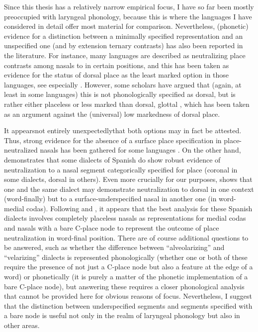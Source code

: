 Since this thesis has a relatively narrow empirical focus, I have so far been mostly preoccupied with laryngeal phonology, because this is where the languages I have considered in detail offer most material for comparison. Nevertheless, (phonetic) evidence for a distinction between a minimally specified representation and an unspecified one (and by extension ternary contrasts) has also been reported in the literature. For instance, many languages are described as neutralizing place contrasts among nasals to  in certain positions, and this has been taken as evidence for the status of dorsal place as the least marked option in those languages, see especially \citet{rice96:_defaul_variab}. However, some scholars have argued that (again, at least in some languages) this  is not phonologically specified as dorsal, but is rather either placeless \citep{trigo88,bakovic00:_nasal_spanis} or less marked than dorsal, \ie glottal \citep[§2.2.1.1.1]{delacy2006}, which has been taken as an argument against the (universal) low markedness of dorsal place.

It appears\dash not entirely unexpectedly\dash that both options may in fact be attested. Thus, strong evidence for the absence of a surface place specification in place\hyp neutralized nasals has been gathered for some languages \citep{trigo88}. On the other hand, \citet{ramsammy11:_spanis,ramsammyng:_word_spanis} demonstrates that some dialects of Spanish do show robust evidence of neutralization to a nasal segment categorically specified for place (coronal in some dialects, dorsal in others). Even more crucially for our purposes, \citet{ramsammy11:_spanis} shows that one and the same dialect may demonstrate neutralization to dorsal in one context (word-finally) but to a surface\hyp underspecified nasal in another one (in word\hyp medial codas). Following \citet{rice96:_defaul_variab} and \citet{ramsammy11:_spanis}, it appears that the best analysis for these Spanish dialects involves completely placeless nasals as representations for medial codas and nasals with a bare C-place node to represent the outcome of place neutralization in word\hyp final position. There are of course additional questions to be answered, such as whether the difference between \enquote{alveolarizing} and \enquote{velarizing} dialects is represented phonologically (\ie whether one or both of these require the presence of not just a C-place node but also a feature at the edge of a word) or phonetically (\ie it is purely a matter of the phonetic implementation of a bare C-place node), but answering these requires a closer phonological analysis that cannot be provided here for obvious reasons of focus. Nevertheless, I suggest that the distinction between underspecified segments and segments specified with a bare node is useful not only in the realm of laryngeal phonology but also in other areas.


